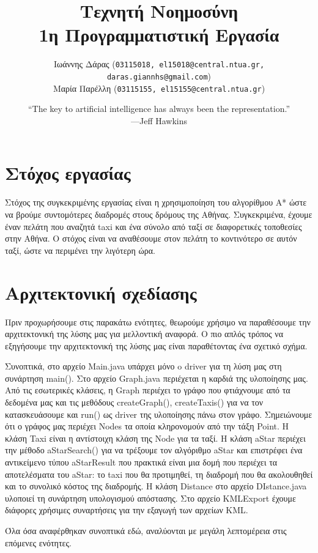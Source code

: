 \documentclass[a4paper,oneside, 11pt]{article}
\title{\textbf{Τεχνητή Νοημοσύνη \\ 1η Προγραμματιστική Εργασία}}
\author{ Ιωάννης Δάρας (\texttt{03115018, el15018@central.ntua.gr, daras.giannhs@gmail.com}) \\
	Μαρία Παρέλλη (\texttt{03115155, el15155@central.ntua.gr})
}
\date{“The key to artificial intelligence has always been the representation.” \\ —Jeff Hawkins}
\begin{document}
\maketitle
\noindent\makebox[\linewidth]{\rule{\paperwidth}{0.4pt}}

\section{Στόχος εργασίας}
Στόχος της συγκεκριμένης εργασίας είναι η χρησιμοποίηση του αλγορίθμου A* ώστε να βρούμε συντομότερες διαδρομές στους δρόμους της Αθήνας. Συγκεκριμένα, έχουμε έναν πελάτη που αναζητά taxi και ένα σύνολο από ταξί σε διαφορετικές τοποθεσίες στην Αθήνα. Ο στόχος είναι να αναθέσουμε στον πελάτη το κοντινότερο σε αυτόν ταξί, ώστε να περιμένει την λιγότερη ώρα.

\section{Αρχιτεκτονική σχεδίασης}
Πριν προχωρήσουμε στις παρακάτω ενότητες, θεωρούμε χρήσιμο να παραθέσουμε την αρχιτεκτονική της λύσης μας για μελλοντική αναφορά. 
Ο πιο απλός τρόπος να εξηγήσουμε την αρχιτεκτονική της λύσης μας είναι παραθέτοντας ένα σχετικό σχήμα.

Συνοπτικά, στο αρχείο Main.java υπάρχει μόνο o driver για τη λύση μας στη συνάρτηση main(). Στο αρχείο Graph.java περιέχεται η καρδιά της υλοποίησης μας. Από τις εσωτερικές κλάσεις, η Graph περιέχει το γράφο που φτιάχνουμε από τα δεδομένα μας και τις μεθόδους createGraph(), createTaxis() για να τον κατασκευάσουμε και run() ως driver της υλοποίησης πάνω στον γράφο. Σημειώνουμε ότι ο γράφος μας περιέχει Nodes τα οποία κληρονομούν από την τάξη Point. Η κλάση Taxi είναι η αντίστοιχη κλάση της Node για τα ταξί. Η κλάση aStar περιέχει την μέθοδο aStarSearch() για να τρέξουμε τον αλγόριθμο aStar και επιστρέφει ένα αντικείμενο τύπου aStarResult που πρακτικά είναι μια δομή που περιέχει τα αποτελέσματα του aStar: το taxi που θα προτιμηθεί, τη διαδρομή που θα ακολουθηθεί και το συνολικό κόστος της διαδρομής. Η κλάση Distance στο αρχείο DIstance.java υλοποιεί τη συνάρτηση υπολογισμού απόστασης. Στο αρχείο KMLExport έχουμε διάφορες χρήσιμες συναρτήσεις για την εξαγωγή των αρχείων KML. \bigbreak

Όλα όσα αναφέρθηκαν συνοπτικά εδώ, αναλύονται με μεγάλη λεπτομέρεια στις επόμενες ενότητες.
\end{document}
